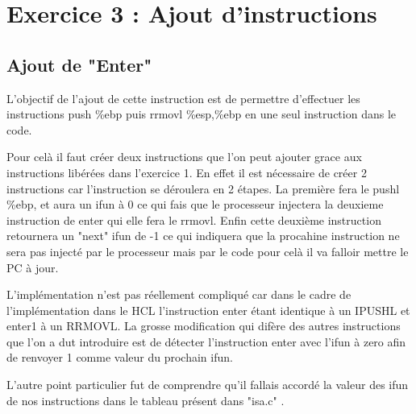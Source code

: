 \documentclass[12pt]{article}
\begin{document}
\section{Exercice 3 : Ajout d'instructions}
\subsection{Ajout de "Enter"}
L'objectif de l'ajout de cette instruction est de permettre d'effectuer les instructions push \%ebp puis rrmovl \%esp,\%ebp en une seul instruction dans le code.

Pour celà il faut créer deux instructions que l'on peut ajouter grace aux instructions libérées dans l'exercice 1. En effet il est nécessaire de créer 2 instructions car l'instruction se déroulera en 2 étapes. La première fera le pushl \%ebp, et  aura un ifun à 0 ce qui fais que le processeur injectera la deuxieme instruction de enter qui elle fera le rrmovl. Enfin cette deuxième instruction retournera un "next" ifun de -1 ce qui indiquera que la procahine instruction ne sera pas injecté par le processeur mais par le code pour celà il va falloir mettre le PC à jour.

L'implémentation n'est pas réellement compliqué car dans le cadre de l'implémentation dans le HCL l'instruction enter étant identique à un IPUSHL et enter1 à un RRMOVL. La grosse modification qui difère des autres instructions que l'on a dut introduire est de détecter l'instruction enter avec l'ifun à zero afin de renvoyer 1 comme valeur du prochain ifun. 

L'autre point particulier fut de comprendre qu'il fallais accordé la valeur des ifun de nos instructions dans le tableau présent dans "isa.c" .
\end{document}
